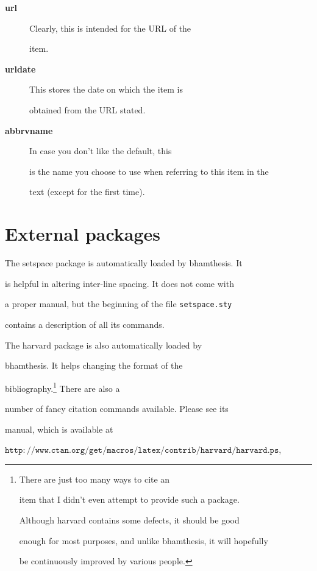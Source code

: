 \documentclass{bhamthesis}
\newcommand{\clsname}{\pkg{bhamthesis}}
\newcommand{\pkg}[1]{\textsf{#1}}
\newcommand{\file}[1]{\texttt{#1}}
\newcommand{\bfield}[1]{\textbf{#1}}
\newcommand{\cmddessep}{\renewcommand{\labelsep}{2em}}
\providecommand{\url}[1]{\(\mathtt{#1}\)}
\begin{document}
\begin{description}\cmddessep

\item[\bfield{url}] Clearly, this is intended for the URL of the

  item.

\item[\bfield{urldate}] This stores the date on which the item is

  obtained from the URL stated.

\item[\bfield{abbrvname}] In case you don't like the default, this

  is the name you choose to use when referring to this item in the

  text (except for the first time).

\end{description}



\section{External packages}

The \pkg{setspace} package is automatically loaded by \clsname. It

is helpful in altering inter-line spacing.  It does not come with

a proper manual, but the beginning of the file \file{setspace.sty}

contains a description of all its commands.



The \pkg{harvard} package is also automatically loaded by

\clsname.  It helps changing the format of the

bibliography.\footnote{There are just too many ways to cite an

item that I didn't even attempt to provide such a package.

Although \pkg{harvard} contains some defects, it should be good

enough for most purposes, and unlike \clsname, it will hopefully

be continuously improved by various people.} There are also a

number of fancy citation commands available. Please see its

manual, which is available at

\url{http://www.ctan.org/get/macros/latex/contrib/harvard/harvard.ps},
\end{document}

